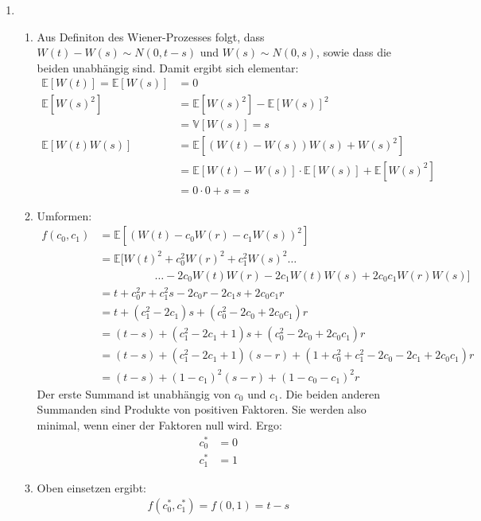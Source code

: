 \documentclass[11pt,a4paper,fullpage]{article}
\newcommand{\E}{\mathbb E}
\begin{document}
\begin{enumerate}
\item
\begin{enumerate}
\item Aus Definiton des Wiener-Prozesses folgt, dass $W\left(t\right) - W\left(s\right) \sim N\left(0,t-s\right)$ und $W\left(s\right) \sim N\left(0,s\right)$, sowie dass die beiden unabhängig sind. Damit ergibt sich elementar:
\begin{align*}
\E\left[W\left(t\right)\right] = \E\left[W\left(s\right)\right] &= 0 \\
\E\left[W\left(s\right)^2\right] &= \E\left[W\left(s\right)^2\right] - \E\left[W\left(s\right)\right]^2 \\
&= \mathbb V\left[W\left(s\right)\right] = s \\
\E\left[W\left(t\right)W\left(s\right)\right] &= \E\left[\left(W\left(t\right)-W\left(s\right)\right)W\left(s\right) + W\left(s\right)^2\right] \\
&= \E\left[W\left(t\right)-W\left(s\right)\right] \cdot \E\left[W\left(s\right)\right] + \E\left[W\left(s\right)^2\right] \\
&= 0 \cdot 0 + s = s
\end{align*}
\item Umformen:
\begin{align*}
f\left(c_0, c_1\right) &= \E\left[\left(W\left(t\right) - c_0 W\left(r\right) - c_1 W\left(s\right)\right)^2\right] \\
&= \E\Big[W\left(t\right)^2  + c_0^2 W\left(r\right)^2 + c_1^2 W\left(s\right)^2 \hdots \\ &\hspace{60pt} \hdots - 2c_0W\left(t\right)W\left(r\right) - 2c_1W\left(t\right)W\left(s\right) + 2c_0c_1W\left(r\right)W\left(s\right)\Big] \\
&= t + c_0^2r + c_1^2s - 2c_0r - 2c_1s + 2c_0c_1r \\
&= t + \left(c_1^2 - 2c_1\right)s + \left(c_0^2 - 2c_0 + 2c_0c_1\right)r \\
&= \left(t-s\right) + \left(c_1^2 - 2c_1 + 1\right)s + \left(c_0^2 - 2c_0 + 2c_0c_1\right)r \\
&= \left(t-s\right) + \left(c_1^2 - 2c_1 + 1\right)\left(s-r\right) + \left(1 + c_0^2 + c_1^2 - 2c_0 - 2c_1 + 2c_0c_1\right)r \\
&= \left(t-s\right) + \left(1 - c_1\right)^2\left(s-r\right) + \left(1 - c_0 - c_1\right)^2r
\end{align*}
Der erste Summand ist unabhängig von $c_0$ und $c_1$. Die beiden anderen Summanden sind Produkte von positiven Faktoren. Sie werden also minimal, wenn einer der Faktoren null wird. Ergo:
\begin{align*}
c_0^* &= 0 \\
c_1^* &= 1
\end{align*}

\item Oben einsetzen ergibt:
\begin{align*}
f\left(c_0^*, c_1^*\right) = f\left(0,1\right) = t-s
\end{align*} 
\end{enumerate}


\end{enumerate}
\end{document}
